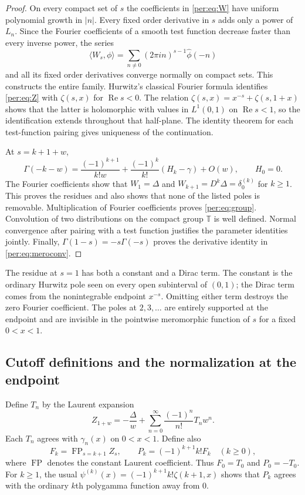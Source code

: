 \documentclass[11pt,letterpaper]{article}
\numberwithin{equation}{section}
\theoremstyle{plain}
\theoremstyle{definition}
\theoremstyle{remark}
\begin{document}
\begin{proof}
On every compact set of $s$ the coefficients in \eqref{per:eq:W} have
uniform polynomial growth in $|n|$. Every fixed order derivative in $s$
adds only a power of $L_n$. Since the Fourier coefficients of a smooth
test function decrease faster than every inverse power, the series
\[
 \langle W_s,\phi\rangle
 =\sum_{n\ne0}(2\pi i n)^{s-1}\widehat\phi(-n)
\]
and all its fixed order derivatives converge normally on compact sets.
This constructs the entire family. Hurwitz's classical Fourier formula
\cite[\S25.11]{DLMFHurwitz} identifies \eqref{per:eq:Z} with $\zeta(s,x)$
for $\operatorname{Re}s<0$. The relation
$\zeta(s,x)=x^{-s}+\zeta(s,1+x)$ shows that the latter is holomorphic
with values in $L^1(0,1)$ on $\operatorname{Re}s<1$, so the
identification extends throughout that half-plane. The identity theorem
for each test-function pairing gives uniqueness of the continuation.

At $s=k+1+w$,
\begin{equation}\label{per:eq:gammapole}
 \Gamma(-k-w)=\frac{(-1)^{k+1}}{k!w}
       +\frac{(-1)^k}{k!}(H_k-\gamma)+O(w),
 \qquad H_0=0.
\end{equation}
The Fourier coefficients show that $W_1=\Delta$ and
$W_{k+1}=D^k\Delta=\delta_0^{(k)}$ for $k\ge1$.
This proves the residues and also shows that none of the listed poles
is removable. Multiplication of Fourier coefficients proves
\eqref{per:eq:group}. Convolution of two distributions on the compact
group $\mathbb T$ is well defined. Normal convergence after pairing with
a test function justifies the parameter identities jointly. Finally,
$\Gamma(1-s)=-s\Gamma(-s)$ proves the derivative identity in
\eqref{per:eq:meroconv}.
\end{proof}

The residue at $s=1$ has both a constant and a Dirac term. The constant
is the ordinary Hurwitz pole seen on every open subinterval of $(0,1)$;
the Dirac term comes from the nonintegrable endpoint $x^{-s}$. Omitting
either term destroys the zero Fourier coefficient. The poles at
$2,3,\ldots$ are entirely supported at the endpoint and are invisible
in the pointwise meromorphic function of $s$ for a fixed $0<x<1$.

\subsection{Cutoff definitions and the normalization at the endpoint}

Define $T_n$ by the Laurent expansion
\begin{equation}\label{per:eq:Tdef}
 Z_{1+w}=-\frac{\Delta}{w}
       +\sum_{n=0}^{\infty}\frac{(-1)^n}{n!}T_nw^n.
\end{equation}
Each $T_n$ agrees with $\gamma_n(x)$ on $0<x<1$. Define also
\begin{equation}\label{per:eq:Pdef}
 F_k=\operatorname{FP}_{s=k+1}Z_s,\qquad
 P_k=(-1)^{k+1}k!F_k\quad(k\ge0),
\end{equation}
where $\operatorname{FP}$ denotes the constant Laurent coefficient.
Thus $F_0=T_0$ and $P_0=-T_0$. For $k\ge1$, the usual
$\psi^{(k)}(x)=(-1)^{k+1}k!\zeta(k+1,x)$ shows that $P_k$ agrees with
the ordinary $k$th polygamma function away from $0$.
\end{document}
